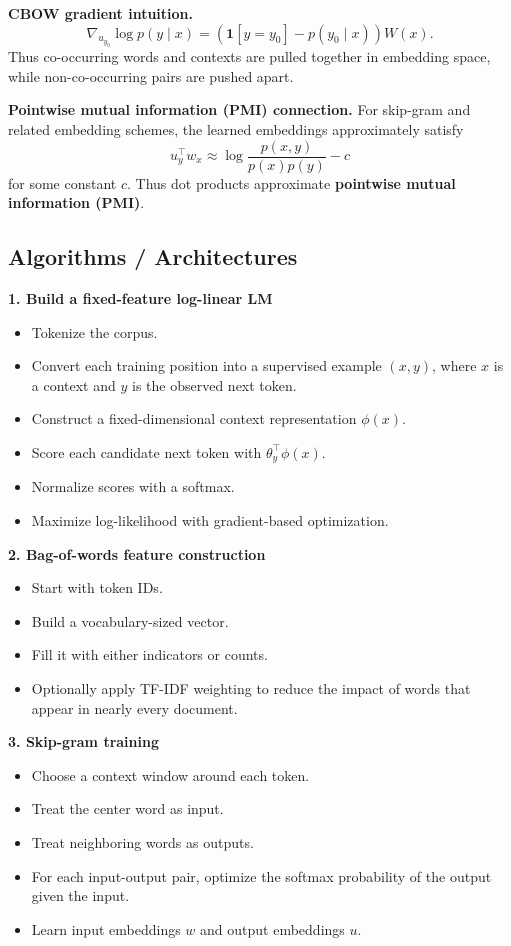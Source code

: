 \documentclass[11pt]{article}
\begin{document}
\textbf{CBOW gradient intuition.}
\[
\nabla_{u_{y_0}} \log p(y \mid x)
= \left(\mathbf{1}[y=y_0] - p(y_0 \mid x)\right) W(x).
\]
Thus co-occurring words and contexts are pulled together in embedding space, while non-co-occurring pairs are pushed apart.

\textbf{Pointwise mutual information (PMI) connection.} For skip-gram and related embedding schemes, the learned embeddings approximately satisfy
\[
u_y^\top w_x \approx \log \frac{p(x,y)}{p(x)p(y)} - c
\]
for some constant \(c\). Thus dot products approximate \textbf{pointwise mutual information (PMI)}.

\subsection{Algorithms / Architectures}
\textbf{1. Build a fixed-feature log-linear LM}
\begin{itemize}
    \item Tokenize the corpus.
    \item Convert each training position into a supervised example \((x,y)\), where \(x\) is a context and \(y\) is the observed next token.
    \item Construct a fixed-dimensional context representation \(\phi(x)\).
    \item Score each candidate next token with \(\theta_y^\top \phi(x)\).
    \item Normalize scores with a softmax.
    \item Maximize log-likelihood with gradient-based optimization.
\end{itemize}

\textbf{2. Bag-of-words feature construction}
\begin{itemize}
    \item Start with token IDs.
    \item Build a vocabulary-sized vector.
    \item Fill it with either indicators or counts.
    \item Optionally apply TF-IDF weighting to reduce the impact of words that appear in nearly every document.
\end{itemize}

\textbf{3. Skip-gram training}
\begin{itemize}
    \item Choose a context window around each token.
    \item Treat the center word as input.
    \item Treat neighboring words as outputs.
    \item For each input-output pair, optimize the softmax probability of the output given the input.
    \item Learn input embeddings \(w\) and output embeddings \(u\).
\end{itemize}
\end{document}
